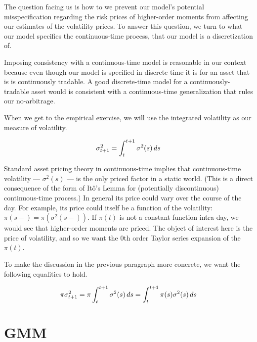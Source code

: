 \documentclass[11pt, letterpaper, twoside, final]{article}
\begin{document}
The question facing us is how to we prevent our model's potential misspecification regarding the risk prices of
higher-order moments from affecting our estimates of the volatility prices.
To answer this question, we turn to what our model specifies the continuous-time process, that our model is a
discretization of.

Imposing consistency with a continuous-time model is reasonable in our context because even though our model is
specified in discrete-time it is for an asset that is is continuously tradable.
A good discrete-time model for a continuously-tradable asset would is consistent with a continuous-time
generalization that rules our no-arbitrage.

When we get to the empirical exercise, we will use the integrated volatility as our measure of volatility.
 
\begin{defn}
    \begin{equation}
        \sigma^2_{t+1} = \int_{t}^{t+1} \sigma^2(s) \mathop{}\!d s
    \end{equation}
\end{defn}

Standard asset pricing theory in continuous-time implies that continuous-time volatility --- $\sigma^2(s)$ ---
is the only priced factor \parencites{merton1973intertemporal, tsai2018pricing, sangrey2018jumps} in a static
world.
(This is a direct consequence of the form of It\^{o}'s Lemma for (potentially discontinuous) continuous-time
process.)
In general its price could vary over the course of the day.
For example, its price could  itself be a function of the volatility: $\pi(s-) = \pi(\sigma^2(s-))$.
If $\pi(t)$ is not a constant function intra-day, we would see that higher-order moments are priced.
The object of interest here is the price of volatility, and so we want the 0th order Taylor series expansion of
the $\pi(t)$.

To make the discussion in the previous paragraph more concrete, we want the following equalities to hold. 

\begin{equation}
    \pi \sigma^2_{t+1} = \pi \int_{t}^{t+1} \sigma^2(s) \mathop{}\!d s =  \int_{t}^{t+1} \pi(s) \sigma^2(s) \mathop{}\!d s
\end{equation}




\section{GMM}\label{sec:GMM}
\end{document}
